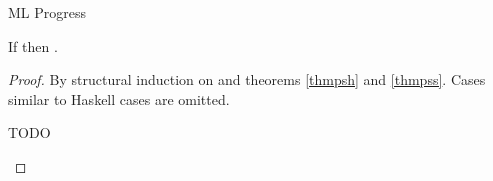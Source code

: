 \begin{theorem}{ML Progress}

\label{thmpsm}

If \judem{}{\first{\varexpm}}{\vartym} then \pshyp{\first{\varexpm}}{\second{\varexpm}}.

\begin{proof}

By structural induction on \first{\varexpm} and theorems \ref{thmpsh} and \ref{thmpss}.  Cases similar to Haskell cases are omitted.


\newcommand{\psmh}{\expmh{\first{\vartym}}{\first{\vartyh}}{\first{\varexph}}\xspace}

\begin{case}{\psmh}

\pshypby
{\first{\varexph}}
{\second{\varexph}}
\pscasestwo
{\first{\varexph}}
{\first{\vartym}}
{\first{\vartyh}}
{\psmh}


TODO

\begin{subcase}{}

\end{subcase}

\pssub
{\first{\varexph}}
{\second{\varexph}}
{\psmh}
{\expmh{\first{\vartym}}{\first{\vartyh}}{\second{\varexph}}}
\pserr
{\first{\varexph}}
{\psmh}

\end{case}


\newcommand{\psfappm}{\expfapp{\first{\varexpm}}{\second{\varexpm}}}
\renewcommand{\x}{\expfabss{\varvarm}{\first{\vartym}}{\third{\varexpm}}}

\begin{case}{\psfappm}

\pshypby
{\first{\varexpm}}
{\third{\varexpm}}
\psvalifeqm
{\first{\varexpm}}
{\tyfun{\first{\vartym}}{\second{\vartym}}}
{\x}
\pssub
{\first{\varexpm}}
{\third{\varexpm}}
{\psfappm}
{\expfapp{\third{\varexpm}}{\second{\varexpm}}}
\pserr
{\first{\varexpm}}
{\psfappm}
\pshypby
{\second{\varexpm}}
{\third{\varexpm}}
\pssuband
{\second{\varexpm}}
{\third{\varexpm}}
{\first{\varexpm}}
{\psfappm}
{\expfapp{\first{\varexpm}}{\third{\varexpm}}}
\pserrand
{\second{\varexpm}}
{\first{\varexpm}}
{\psfappm}
\psredif
{\first{\varexpm}}
{\second{\varexpm}}
{\expfapp{(\x)}{\second{\varexpm}}}
{\expsubst{\third{\varexpm}}{\second{\varexpm}}{\varvarm}}


\end{case}
\end{proof}
\end{theorem}

